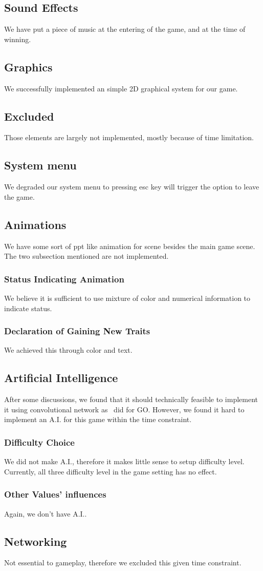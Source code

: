 	\subsection{Sound Effects}
	We have put a piece of music at the entering of the game, and at the time of winning.
\subsection{Graphics}
We successfully implemented an simple 2D graphical system for our game.

\subsection{Excluded}
Those elements are largely not implemented, mostly because of time limitation.
\subsection{System menu}
We degraded our system menu to pressing esc key will trigger the option to leave the game.
\subsection{Animations}
We have some sort of ppt like animation for scene besides the main game scene. The two subsection mentioned are not implemented.
\subsubsection{Status Indicating Animation}
We believe it is sufficient to use mixture of color and numerical information to indicate status.

\subsubsection{Declaration of Gaining New Traits}
We achieved this through color and text.

\subsection{Artificial Intelligence}
After some discussions, we found that it should technically feasible to implement it using convolutional network as~\cite{ClarkS14} did for GO.
However, we found it hard to implement an A.I. for this game within the time constraint. 

\subsubsection{Difficulty Choice}
We did not make A.I., therefore it makes little sense to setup difficulty level. Currently, all three difficulty level in the game setting has no effect.

\subsubsection{Other Values' influences}
Again, we don't have A.I..

	\subsection{Networking}
		Not essential to gameplay, therefore we excluded this given time constraint.
	